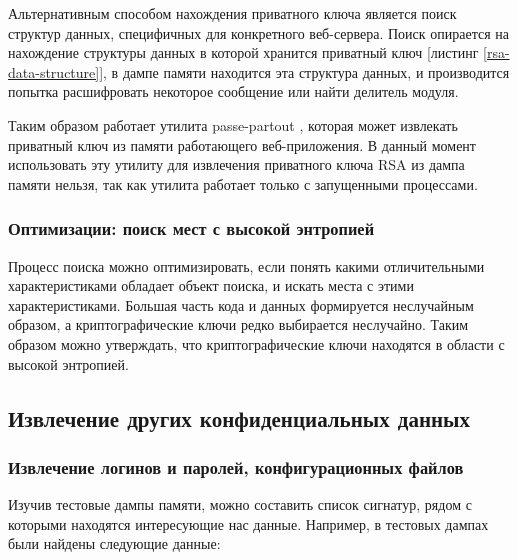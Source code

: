 \documentclass[20pt]{article}
\begin{document}
Альтернативным способом нахождения приватного ключа является поиск структур
данных, специфичных для конкретного веб-сервера. Поиск опирается на нахождение
структуры данных в которой хранится приватный ключ [листинг \ref{rsa-data-structure}],
в дампе памяти находится эта структура данных, и производится попытка расшифровать
некоторое сообщение или найти делитель модуля.

Таким образом работает утилита passe-partout \cite{passe-partout}, которая может
извлекать приватный ключ из памяти работающего веб-приложения. В данный момент
использовать эту утилиту для извлечения приватного ключа RSA из дампа памяти
нельзя, так как утилита работает только с запущенными процессами.

\subsubsection{Оптимизации: поиск мест с высокой энтропией}

Процесс поиска можно оптимизировать, если понять какими отличительными
характеристиками обладает объект поиска, и искать места с этими характеристиками.
Большая часть кода и данных формируется неслучайным образом, а криптографические
ключи редко выбирается неслучайно. Таким образом можно утверждать, что
криптографические ключи находятся в области с высокой энтропией.

\subsection{Извлечение других конфиденциальных данных}

\subsubsection{Извлечение логинов и паролей, конфигурационных файлов}

Изучив тестовые дампы памяти, можно составить список сигнатур, рядом с которыми
находятся интересующие нас данные. Например, в тестовых дампах были найдены
следующие данные:
\end{document}
